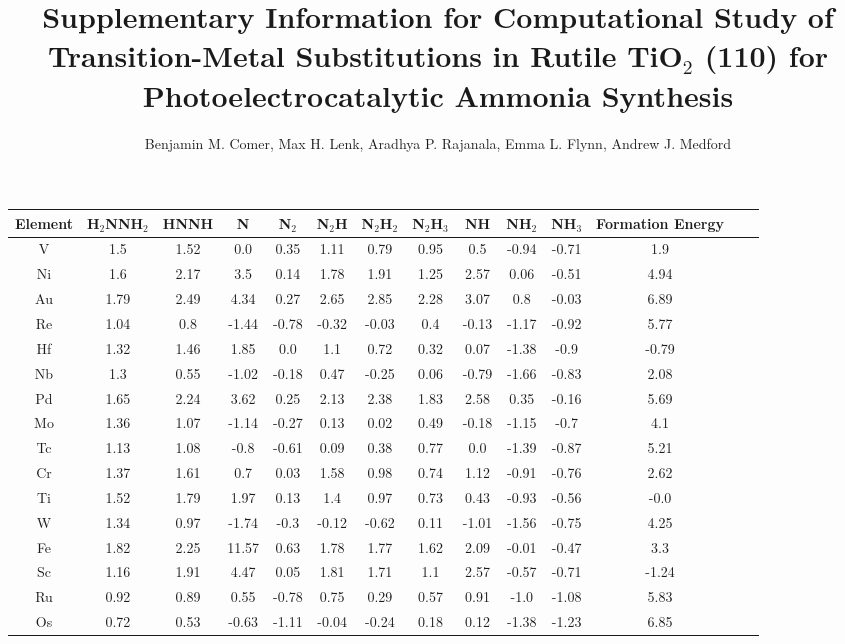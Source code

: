 \documentclass{article}
\title{\TitleFont Supplementary Information for Computational Study of Transition-Metal Substitutions in Rutile TiO$_2$ (110) for Photoelectrocatalytic Ammonia Synthesis}
\author{Benjamin M. Comer, Max H. Lenk, Aradhya P. Rajanala, Emma L. Flynn, Andrew J. Medford}
\begin{document}
\maketitle\begin{table}
\setlength\tabcolsep{2pt}
\begin{center}
\begin{tabular}{| c | c | c | c | c | c | c | c | c | c | c | c | c | c |}
\hline
Element & H$_2$NNH$_2$ & HNNH & N & N$_2$ & N$_2$H & N$_2$H$_2$ & N$_2$H$_3$ & NH & NH$_2$ & NH$_3$ & Formation Energy\\
\hline

V & 1.5 & 1.52 & 0.0 & 0.35 & 1.11 & 0.79 & 0.95 & 0.5 & -0.94 & -0.71 & 1.9 \\
Ni & 1.6 & 2.17 & 3.5 & 0.14 & 1.78 & 1.91 & 1.25 & 2.57 & 0.06 & -0.51 & 4.94 \\
Au & 1.79 & 2.49 & 4.34 & 0.27 & 2.65 & 2.85 & 2.28 & 3.07 & 0.8 & -0.03 & 6.89 \\
Re & 1.04 & 0.8 & -1.44 & -0.78 & -0.32 & -0.03 & 0.4 & -0.13 & -1.17 & -0.92 & 5.77 \\
Hf & 1.32 & 1.46 & 1.85 & 0.0 & 1.1 & 0.72 & 0.32 & 0.07 & -1.38 & -0.9 & -0.79 \\
Nb & 1.3 & 0.55 & -1.02 & -0.18 & 0.47 & -0.25 & 0.06 & -0.79 & -1.66 & -0.83 & 2.08 \\
Pd & 1.65 & 2.24 & 3.62 & 0.25 & 2.13 & 2.38 & 1.83 & 2.58 & 0.35 & -0.16 & 5.69 \\
Mo & 1.36 & 1.07 & -1.14 & -0.27 & 0.13 & 0.02 & 0.49 & -0.18 & -1.15 & -0.7 & 4.1 \\
Tc & 1.13 & 1.08 & -0.8 & -0.61 & 0.09 & 0.38 & 0.77 & 0.0 & -1.39 & -0.87 & 5.21 \\
Cr & 1.37 & 1.61 & 0.7 & 0.03 & 1.58 & 0.98 & 0.74 & 1.12 & -0.91 & -0.76 & 2.62 \\
Ti & 1.52 & 1.79 & 1.97 & 0.13 & 1.4 & 0.97 & 0.73 & 0.43 & -0.93 & -0.56 & -0.0 \\
W & 1.34 & 0.97 & -1.74 & -0.3 & -0.12 & -0.62 & 0.11 & -1.01 & -1.56 & -0.75 & 4.25 \\
Fe & 1.82 & 2.25 & 11.57 & 0.63 & 1.78 & 1.77 & 1.62 & 2.09 & -0.01 & -0.47 & 3.3 \\
Sc & 1.16 & 1.91 & 4.47 & 0.05 & 1.81 & 1.71 & 1.1 & 2.57 & -0.57 & -0.71 & -1.24 \\
Ru & 0.92 & 0.89 & 0.55 & -0.78 & 0.75 & 0.29 & 0.57 & 0.91 & -1.0 & -1.08 & 5.83 \\
Os & 0.72 & 0.53 & -0.63 & -1.11 & -0.04 & -0.24 & 0.18 & 0.12 & -1.38 & -1.23 & 6.85 \\

\end{tabular}
\end{center}
\end{table}
\end{document}
